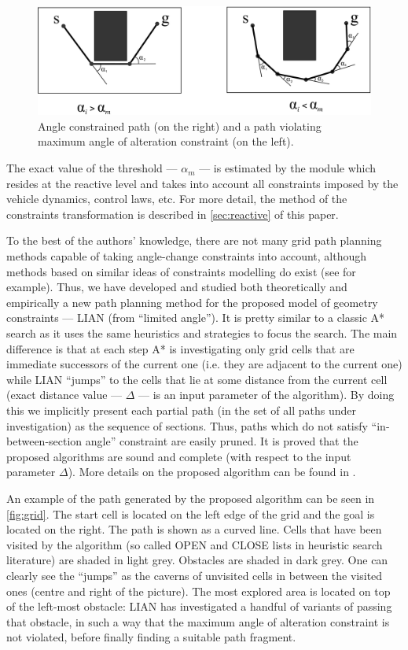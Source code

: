 \documentclass[review]{elsarticle}
\begin{document}
\begin{figure}[h]
	\centering
		\includegraphics[width=\textwidth]{path_lian.png}
	\caption{Angle constrained path (on the right) and a path violating maximum angle of alteration constraint (on the left).}
	\label{fig:angles}
\end{figure}

The exact value of the threshold --- $\alpha_m$ --- is estimated by the module which resides at the reactive level and takes into account all constraints imposed by the vehicle dynamics, control laws, etc. For more detail, the method of the constraints transformation is described in \autoref{sec:reactive} of this paper.

To the best of the authors' knowledge, there are not many grid path planning methods capable of taking angle-change constraints into account, although methods based on similar ideas of constraints modelling do exist (see \cite{Kim2014} for example). Thus, we have developed and studied both theoretically and empirically a new path planning method for the proposed model of geometry constraints --- LIAN (from ``limited angle''). It is pretty similar to a classic A* search as it uses the same heuristics and strategies to focus the search. The main difference is that at each step A* is investigating only grid cells that are immediate successors of the current one (i.e. they are adjacent to the current one) while LIAN ``jumps'' to the cells that lie at some distance from the current cell (exact distance value --- $\Delta$ --- is an input parameter of the algorithm). By doing this we implicitly present each partial path (in the set of all paths under investigation) as the sequence of sections. Thus, paths which do not satisfy ``in-between-section angle'' constraint are easily pruned. It is proved that the proposed algorithms are sound and complete (with respect to the input parameter $\Delta$). More details on the proposed algorithm can be found in \cite{Yakovlev2015a,Yakovlev2015b}.

An example of the path generated by the proposed algorithm can be seen in \autoref{fig:grid}. The start cell is located on the left edge of the grid and the goal is located on the right. The path is shown as a curved line. Cells that have been visited by the algorithm (so called OPEN and CLOSE lists in heuristic search literature) are shaded in light grey. Obstacles are shaded in dark grey. One can clearly see the ``jumps'' as the caverns of unvisited cells in between the visited ones (centre and right of the picture). The most explored area is located on top of the left-most obstacle: LIAN has investigated a handful of variants of passing that obstacle, in such a way that the maximum angle of alteration constraint is not violated, before finally finding a suitable path fragment.
\end{document}
